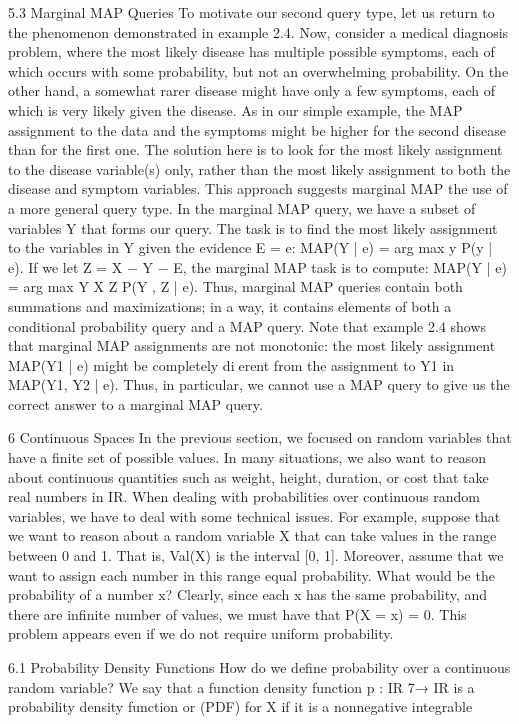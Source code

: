 5.3 Marginal MAP Queries
To motivate our second query type, let us return to the phenomenon demonstrated in example 2.4. Now, consider a medical diagnosis problem, where the most likely disease has multiple possible symptoms, each of which occurs with some probability, but not an overwhelming probability. On the other hand, a somewhat rarer disease might have only a few symptoms, each of which is very likely given the disease. As in our simple example, the MAP assignment to the data and the symptoms might be higher for the second disease than for the first one. The solution here is to look for the most likely assignment to the disease variable(s) only, rather than the most likely assignment to both the disease and symptom variables. This approach suggests marginal MAP the use of a more general query type. In the marginal MAP query, we have a subset of variables Y that forms our query. The task is to find the most likely assignment to the variables in Y given the evidence E = e: MAP(Y | e) = arg max y P(y | e). If we let Z = X − Y − E, the marginal MAP task is to compute: MAP(Y | e) = arg max Y X Z P(Y , Z | e). Thus, marginal MAP queries contain both summations and maximizations; in a way, it contains elements of both a conditional probability query and a MAP query. Note that example 2.4 shows that marginal MAP assignments are not monotonic: the most likely assignment MAP(Y1 | e) might be completely dierent from the assignment to Y1 in MAP({Y1, Y2} | e). Thus, in particular, we cannot use a MAP query to give us the correct answer to a marginal MAP query.

6 Continuous Spaces
In the previous section, we focused on random variables that have a finite set of possible values. In many situations, we also want to reason about continuous quantities such as weight, height, duration, or cost that take real numbers in IR. When dealing with probabilities over continuous random variables, we have to deal with some technical issues. For example, suppose that we want to reason about a random variable X that can take values in the range between 0 and 1. That is, Val(X) is the interval [0, 1]. Moreover, assume that we want to assign each number in this range equal probability. What would be the probability of a number x? Clearly, since each x has the same probability, and there are infinite number of values, we must have that P(X = x) = 0. This problem appears even if we do not require uniform probability.

6.1 Probability Density Functions
How do we define probability over a continuous random variable? We say that a function density function p : IR 7→ IR is a probability density function or (PDF) for X if it is a nonnegative integrable

